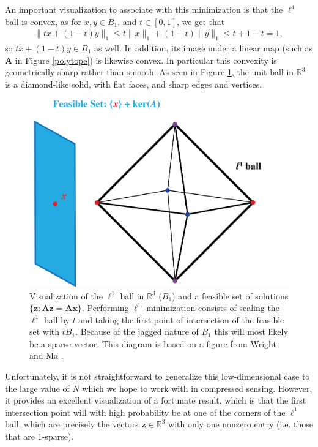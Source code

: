 \documentclass[12pt,a4paper]{amsart}
\numberwithin{equation}{section}
\theoremstyle{plain}
\theoremstyle{definition}
\newcommand{\BR}{\mathbb R}
\newcommand{\bdx}{\mathbf{x}}
\newcommand{\bdz}{\mathbf{z}}
\newcommand{\bdA}{\mathbf{A}}
\begin{document}
An important visualization to associate with this minimization is that the $\ell^1$ ball is convex, as for $x,y\in B_1$, and $t\in[0,1]$, we get that
\begin{align*}
    \|tx+(1-t)y\|_1\leq t\|x\|_1+(1-t)\|y\|_1\leq t+1-t=1,
\end{align*} so $tx+(1-t)y\in B_1$ as well. In addition, its image under a linear map (such as $\bdA$ in Figure \ref{polytope}) is likewise convex. In particular this convexity is geometrically sharp rather than smooth. As seen in Figure \ref{R3-ball}, the unit ball in $\BR^3$ is a diamond-like solid, with flat faces, and sharp edges and vertices.

\begin{figure}
    \centering
    \includegraphics[scale = 0.7]{l1ball_illustration_final.png}
    \caption{Visualization of the $\ell^1$ ball in $\BR^3$ ($B_1$) and a feasible set of solutions $\{\bdz:\bdA\bdz=\bdA\bdx\}$. Performing $\ell^1$-minimization consists of scaling the $\ell^1$ ball by $t$ and taking the first point of intersection of the feasible set with $tB_1$. Because of the jagged nature of $B_1$ this will most likely be a sparse vector. This diagram is based on a figure from Wright and Ma \cite{wm}.}
    \label{R3-ball}
\end{figure}

Unfortunately, it is not straightforward to generalize this low-dimensional case to the large value of $N$ which we hope to work with in compressed sensing. However, it provides an excellent visualization of a fortunate result, which is that the first intersection point will with high probability be at one of the corners of the $\ell^1$ ball, which are precisely the vectors $\bdz\in\BR^3$ with only one nonzero entry (i.e. those that are 1-sparse).
\end{document}
